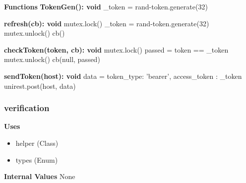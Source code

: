 \documentclass [10pt]{article}
\begin{document}
\textbf{Functions}
\textbf{TokenGen(): void}
\_token = rand-token.generate(32)

\textbf{refresh(cb): void}
mutex.lock()
\_token = rand-token.generate(32)
mutex.unlock()
cb()

\textbf{checkToken(token, cb): void}
mutex.lock()
passed = token == \_token
mutex.unlock()
cb(null, passed)

\textbf{sendToken(host): void}
data = {
	token\_type: 'bearer',
	access\_token : \_token
}
unirest.post(host, data)


\subsubsection{verification}
\textbf{Uses}
\begin{itemize}
	\item helper (Class)
	\item types (Enum)
\end{itemize}

\textbf{Internal Values}
None
\end{document}
